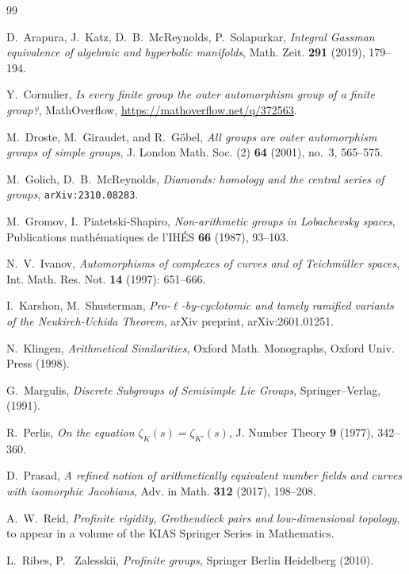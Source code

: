 \documentclass[11pt]{amsart}
\numberwithin{equation}{section}
\begin{document}
\begin{thebibliography}{99}

 D.~Arapura, J.~Katz, D.~B.~McReynolds, P.~Solapurkar, {\em Integral Gassman equivalence of algebraic and hyperbolic manifolds}, Math. Zeit. {\bf 291} (2019), 179--194. 

Y.~Cornulier, \emph{Is every finite group the outer automorphism group of a finite group?}, MathOverflow, \url{https://mathoverflow.net/q/372563}.

M.~Droste, M.~Giraudet, and R.~G\"obel,
\emph{All groups are outer automorphism groups of simple groups}, J. London Math. Soc. (2) \textbf{64} (2001), no.~3, 565--575.

 M.~Golich, D.~B.~McReynolds, {\em Diamonds: homology and the central series of groups}, {\tt{arXiv:2310.08283}}.

 M.~Gromov, I.~Piatetski-Shapiro, \emph{Non-arithmetic groups in Lobachevsky spaces}, Publications math\'{e}matiques de l'IH\'{E}S \textbf{66} (1987), 93--103.

 N.~V.~Ivanov, \emph{Automorphisms of complexes of curves and of Teichm\"uller spaces}, Int. Math. Res. Not. \textbf{14} (1997): 651--666.

 I.~Karshon, M.~Shusterman, \emph{Pro-$\ell$-by-cyclotomic and tamely ramified variants of the Neukirch-Uchida Theorem}, arXiv preprint, arXiv:2601.01251.

 N.~Klingen, {\em Arithmetical Similarities}, Oxford Math. Monographs, Oxford Univ. Press (1998).

 G.~Margulis, \emph{Discrete Subgroups of Semisimple Lie Groups}, Springer--Verlag, (1991).

 R.~Perlis, {\em On the equation $\zeta_K(s) = \zeta_{K'} (s)$}, J. Number Theory {\bf 9} (1977), 342--360.

 D.~Prasad, {\em A refined notion of arithmetically equivalent number fields and curves with isomorphic Jacobians}, Adv. in Math. {\bf 312} (2017), 198--208. 

 A.~W.~Reid, {\em Profinite rigidity, Grothendieck pairs and low-dimensional topology}, to appear in a volume of the KIAS Springer Series in Mathematics.

L.~Ribes, P. ~Zalesskii, \emph{Profinite groups}, Springer Berlin Heidelberg (2010).


\end{thebibliography}
\end{document}
